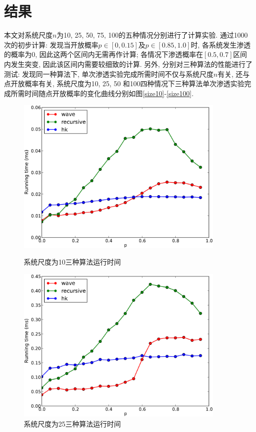 \documentclass[11pt,a4paper,boxed]{caspset}
\begin{document}
\section{结果}
本文对系统尺度$n$为10, 25, 50, 75, 100的五种情况分别进行了计算实验. 通过1000次的初步计算: 发现当开放概率$p\in[0,0.15]$及$p\in[0.85,1.0]$时, 各系统发生渗透的概率为0, 因此这两个区间内无需再作计算; 各情况下渗透概率在$[0.5, 0.7]$区间内发生突变, 因此该区间内需要较细致的计算. 另外, 分别对三种算法的性能进行了测试: 发现同一种算法下, 单次渗透实验完成所需时间不仅与系统尺度$n$有关, 还与点开放概率有关, 系统尺度为10, 25, 50 和100四种情况下三种算法单次渗透实验完成所需时间随点开放概率的变化曲线分别如图\ref{size10}-\ref{size100}.
\begin{figure}[!htb]
\begin{minipage}[b]{.5\textwidth}
\centering
\includegraphics[width=0.9\textwidth]{10.pdf}
\caption{\label{size10}系统尺度为10三种算法运行时间}
\end{minipage}
\begin{minipage}[b]{.5\textwidth}
\centering
\includegraphics[width=0.9\textwidth]{25.pdf}
\caption{\label{size25}系统尺度为25三种算法运行时间}
\end{minipage}
\end{figure}
\end{document}
